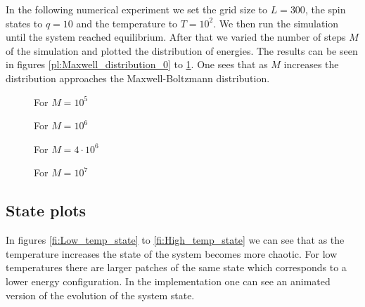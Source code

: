 In the following numerical experiment we set the grid size to $L=300$, the spin states to $q=10$ and the temperature to $T=10^2$. We then run the simulation until the system reached equilibrium. After that we varied the number of steps $M$ of the simulation and plotted the distribution of energies. The results can be seen in figures \ref{pl:Maxwell_distribution_0} to \ref{pl:Maxwell_distribution_3}. One sees that as $M$ increases the distribution approaches the Maxwell-Boltzmann distribution.

\begin{figure}
\begin{minipage}[b]{0.4\textwidth}
\centering

\vspace*{-0.5cm}
\caption{For $M=10^5$}
\label{pl:Maxwell_distribution_0}
\end{minipage}
\hfill
\begin{minipage}[b]{0.4\textwidth}
\centering

\vspace*{-0.5cm}
\caption{For $M=10^6$}
\label{pl:Maxwell_distribution_1}
\end{minipage}
\begin{minipage}[b]{0.4\textwidth}
\vspace*{1cm}
\centering

\vspace*{-0.5cm}
\caption{For $M=4\cdot10^6$}
\label{pl:Maxwell_distribution_2}
\end{minipage}
\hfill
\begin{minipage}[b]{0.4\textwidth}
\centering

\vspace*{-0.5cm}
\caption{For $M=10^7$}
\label{pl:Maxwell_distribution_3}
\end{minipage}
\end{figure}

\subsection{State plots}

In figures \ref{fi:Low_temp_state} to \ref{fi:High_temp_state} we can see that as the temperature increases the state of the system becomes more chaotic. For low temperatures there are larger patches of the same state which corresponds to a lower energy configuration. In the implementation one can see an animated version of the evolution of the system state.

